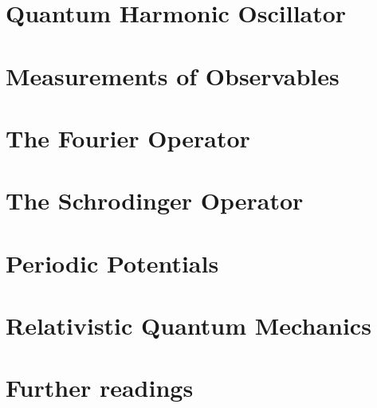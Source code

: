 \documentclass[a4paper,11pt]{article}
\theoremstyle{definition} %
\theoremstyle{plain} %
\theoremstyle{remark} %
\theoremstyle{underline}
\begin{document}
\section{Quantum Harmonic Oscillator}

\newpage

\section{Measurements of Observables}

\newpage

\section{The Fourier Operator}

\newpage

\section{The Schrodinger Operator}

\newpage

\section{Periodic Potentials}

\newpage

\section{Relativistic Quantum Mechanics}

\newpage


\section*{Further readings}

\newpage

\end{document}
